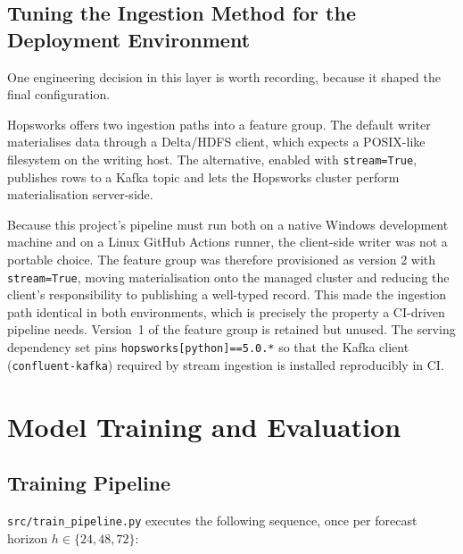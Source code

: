 \documentclass[11pt,a4paper]{article}
\begin{document}
\subsection{Tuning the Ingestion Method for the Deployment Environment}

One engineering decision in this layer is worth recording, because it shaped
the final configuration.

Hopsworks offers two ingestion paths into a feature group. The default writer
materialises data through a Delta/HDFS client, which expects a POSIX-like
filesystem on the writing host. The alternative, enabled with
\texttt{stream=True}, publishes rows to a Kafka topic and lets the Hopsworks
cluster perform materialisation server-side.

Because this project's pipeline must run both on a native Windows development
machine and on a Linux GitHub Actions runner, the client-side writer was not a
portable choice. The feature group was therefore provisioned as version 2 with
\texttt{stream=True}, moving materialisation onto the managed cluster and
reducing the client's responsibility to publishing a well-typed record. This
made the ingestion path identical in both environments, which is precisely the
property a CI-driven pipeline needs. Version~1 of the feature group is retained
but unused. The serving dependency set pins
\texttt{hopsworks[python]==5.0.*} so that the Kafka client
(\texttt{confluent-kafka}) required by stream ingestion is installed
reproducibly in CI.

\section{Model Training and Evaluation}

\subsection{Training Pipeline}

\texttt{src/train\_pipeline.py} executes the following sequence, once per
forecast horizon $h \in \{24, 48, 72\}$:
\end{document}
